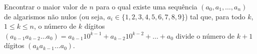 Encontrar o maior valor de $n$ para o qual existe uma sequência $(a_0, a_1, \dots, a_n)$ de algarismos não nulos (ou seja, $a_i \in \{1,2,3,4,5,6,7,8,9\}$) tal que, para todo $k$, $1\le k \le n$, o número de $k$ dígitos $(a_{k-1}a_{k-2}\dots a_0) = a_{k-1}10^{k-1} + a_{k-2}10^{k-2} + \dots + a_0$ divide o número de $k+1$ dígitos $(a_{k}a_{k-1}\dots a_0)$.